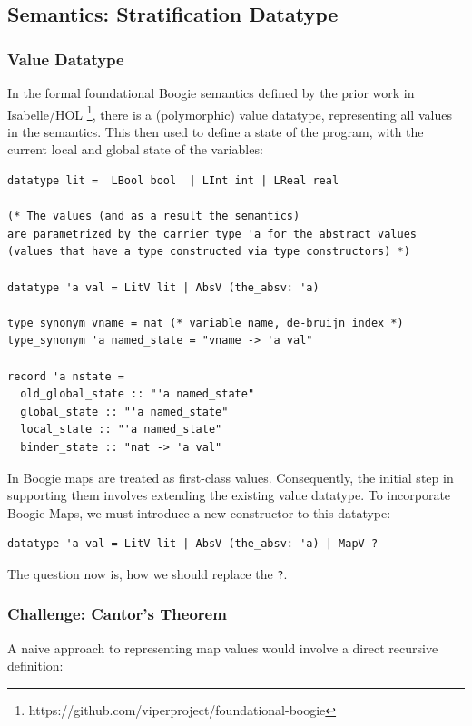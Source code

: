 \documentclass[11pt]{article}
\begin{document}
\subsection{Semantics: Stratification Datatype}

\subsubsection{Value Datatype}
\label{sec:where-to-start}

In the formal foundational Boogie semantics defined by the prior work in Isabelle/HOL
\footnote{https://github.com/viperproject/foundational-boogie},
there is a (polymorphic) value datatype, representing all values in the semantics.
This then used to define a state of the program,
with the current local and global state of the variables:

\begin{verbatim}
datatype lit =  LBool bool  | LInt int | LReal real

(* The values (and as a result the semantics)
are parametrized by the carrier type 'a for the abstract values
(values that have a type constructed via type constructors) *)

datatype 'a val = LitV lit | AbsV (the_absv: 'a)

type_synonym vname = nat (* variable name, de-bruijn index *)
type_synonym 'a named_state = "vname -> 'a val"

record 'a nstate =
  old_global_state :: "'a named_state"
  global_state :: "'a named_state"
  local_state :: "'a named_state"
  binder_state :: "nat -> 'a val"
\end{verbatim}

In Boogie maps are treated as first-class values.
Consequently, the initial step in supporting them involves extending the existing value datatype.
To incorporate Boogie Maps, we must introduce a new constructor to this datatype:

\begin{verbatim}
datatype 'a val = LitV lit | AbsV (the_absv: 'a) | MapV ?
\end{verbatim}

The question now is, how we should replace the \texttt{?}.

\subsubsection{Challenge: Cantor's Theorem}
\label{sec:cantor}

A naive approach to representing map values would involve a direct recursive definition:
\end{document}
